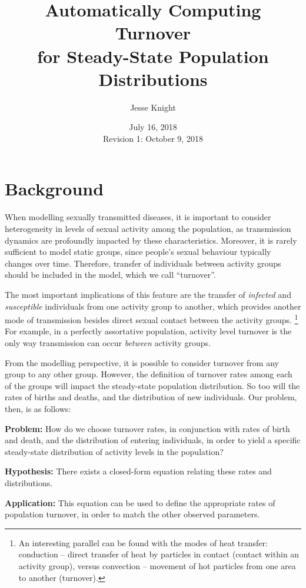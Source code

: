 \documentclass{article}
\title{\vspace{-1.2cm}Automatically Computing Turnover\\for Steady-State Population Distributions}
\author{Jesse Knight}
\date{July 16, 2018\\\footnotesize{Revision 1: October 9, 2018\\[-1em]}}
\begin{document}
\maketitle
\section{Background}
When modelling sexually transmitted diseases, 
it is important to consider heterogeneity in levels of sexual activity among the population,
as transmission dynamics are profoundly impacted by these characteristics.
Moreover, it is rarely sufficient to model static groups,
since people's sexual behaviour typically changes over time.
Therefore, transfer of individuals between activity groups should be included in the model,
which we call ``turnover''.
\par
The most important implications of this feature are the transfer of
\textit{infected} and \textit{susceptible} individuals
from one activity group to another,
which provides another mode of transmission besides
direct sexual contact between the activity groups.%
\footnote{An interesting parallel can be found with the modes of heat transfer:
  conduction -- direct transfer of heat by particles in contact
  (contact within an activity group),
  versus 
  convection -- movement of hot particles from one area to another
  (turnover).}
For example, in a perfectly assortative population,
activity level turnover is the only way transmission can occur \textit{between} activity groups.
\par
From the modelling perspective,
it is possible to consider turnover from any group to any other group.
However, the definition of turnover rates among each of the groups
will impact the steady-state population distribution.
So too will the rates of births and deaths,
and the distribution of new individuals. Our problem, then, is as follows:
\par
\textbf{Problem:} How do we choose turnover rates,
in conjunction with rates of birth and death, and the distribution of entering individuals,
in order to yield a specific steady-state distribution of activity levels in the population?
\par
\textbf{Hypothesis:} There exists a closed-form equation relating these rates and distributions.
\par
\textbf{Application:} This equation can be used to define
the appropriate rates of population turnover,
in order to match the other observed parameters.
\end{document}
